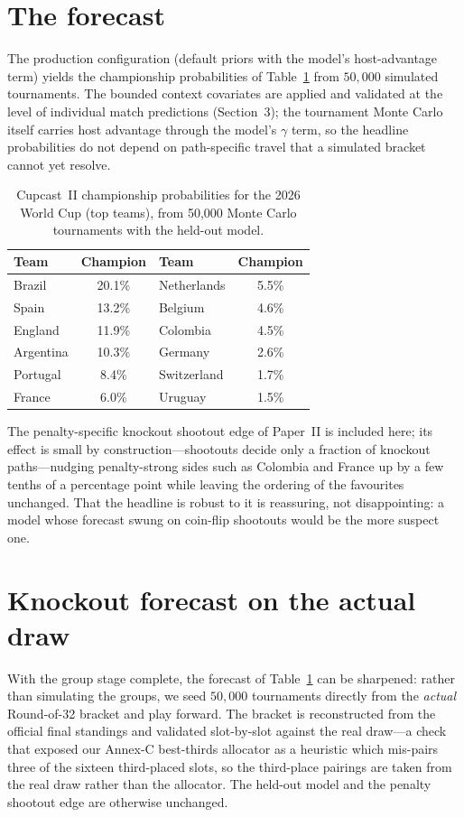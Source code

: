 \documentclass[11pt]{article}
\begin{document}
\section{The forecast}
The production configuration (default priors with the model's host-advantage
term) yields the championship probabilities of Table~\ref{tab:forecast} from
$50{,}000$ simulated tournaments. The bounded context covariates are applied and
validated at the level of individual match predictions (Section~3); the
tournament Monte Carlo itself carries host advantage through the model's
$\gamma$ term, so the headline probabilities do not depend on path-specific
travel that a simulated bracket cannot yet resolve.

\begin{table}[h]\centering
\begin{tabular}{lc@{\qquad}lc}
\toprule
Team & Champion & Team & Champion \\
\midrule
Brazil    & 20.1\% & Netherlands & 5.5\% \\
Spain     & 13.2\% & Belgium     & 4.6\% \\
England   & 11.9\% & Colombia    & 4.5\% \\
Argentina & 10.3\% & Germany     & 2.6\% \\
Portugal  & 8.4\%  & Switzerland & 1.7\% \\
France    & 6.0\%  & Uruguay     & 1.5\% \\
\bottomrule
\end{tabular}
\caption{Cupcast~II championship probabilities for the 2026 World Cup
(top teams), from 50{,}000 Monte Carlo tournaments with the held-out model.}\label{tab:forecast}
\end{table}

The penalty-specific knockout shootout edge of Paper~II is included here; its
effect is small by construction---shootouts decide only a fraction of knockout
paths---nudging penalty-strong sides such as Colombia and France up by a few
tenths of a percentage point while leaving the ordering of the favourites
unchanged. That the headline is robust to it is reassuring, not disappointing:
a model whose forecast swung on coin-flip shootouts would be the more suspect one.

\section{Knockout forecast on the actual draw}
With the group stage complete, the forecast of Table~\ref{tab:forecast} can be
sharpened: rather than simulating the groups, we seed $50{,}000$ tournaments
directly from the \emph{actual} Round-of-32 bracket and play forward. The bracket
is reconstructed from the official final standings and validated slot-by-slot
against the real draw---a check that exposed our Annex-C best-thirds allocator as
a heuristic which mis-pairs three of the sixteen third-placed slots, so the
third-place pairings are taken from the real draw rather than the allocator. The
held-out model and the penalty shootout edge are otherwise unchanged.
\end{document}
